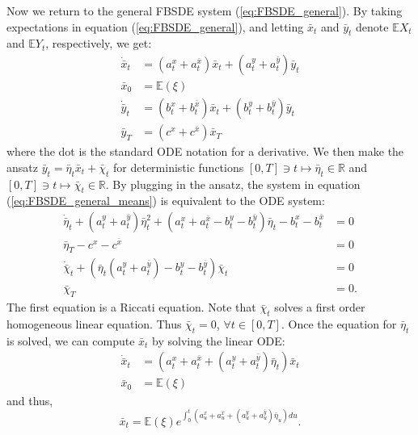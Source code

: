 \documentclass[11pt]{article}
\begin{document}
\begin{appendices}
Now we return to the general FBSDE system (\ref{eq:FBSDE_general}). By taking expectations in equation (\ref{eq:FBSDE_general}), and letting $\bar{x}_t$ and $\bar{y}_t$ denote $\mathbb{E}X_t$ and $\mathbb{E}Y_t$, respectively, we get:
\begin{equation}
\begin{split}
        \dot{\bar{x}}_t&=(a^x_t+a^{\bar{x}}_t)\bar{x}_t+(a^y_t+a^{\bar{y}}_t)\bar{y}_t\\
        \bar{x}_0&=\mathbb{E}(\xi) \\
        \dot{\bar{y}}_t&=(b^x_t+b^{\bar{x}}_t)\bar{x}_t+(b^y_t+b^{\bar{y}}_t)\bar{y}_t\\
        \bar{y}_T&=(c^x+c^{\bar{x}})\bar{x}_T
\end{split}
\label{eq:FBSDE_general_means}
\end{equation}
where the dot is the standard ODE notation for a derivative. We then make the ansatz $\bar{y}_t=\bar{\eta}_t\bar{x}_t+\bar{\chi}_t$ for deterministic functions $[0,T] \ni t \mapsto \bar{\eta}_t \in \mathbb{R}$ and $[0,T] \ni t \mapsto \bar{\chi}_t \in \mathbb{R}$. By plugging in the ansatz, the system in equation (\ref{eq:FBSDE_general_means}) is equivalent to the ODE system:
\begin{equation*}
\begin{split}
    \dot{\bar{\eta}}_t+(a^y_t+a^{\bar{y}}_t) \bar{\eta}_t^2+(a^x_t+a^{\bar{x}}_t-b^y_t-b^{\bar{y}}_t) \bar{\eta}_t -b^x_t-b^{\bar{x}}_t&=0\\
    \bar{\eta}_T-c^x-c^{\bar{x}}&=0 \\
    \dot{\bar{\chi}}_t+(\bar{\eta}_t(a^y_t+a^{\bar{y}}_t)-b^y_t-b^{\bar{y}}_t)\bar{\chi}_t &=0\\
    \bar{\chi}_T&=0.
\end{split}
\end{equation*}
The first equation is a Riccati equation. Note that $\bar{\chi}_t$ solves a first order homogeneous linear equation. Thus $\bar{\chi}_t=0$, $\forall t\in[0,T]$. Once the equation for $\bar{\eta}_t$ is solved, we can compute $\bar{x}_t$ by solving the linear ODE:
\begin{equation*}
\begin{split}
    \dot{\bar{x}}_t&=(a^x_t+a^{\bar{x}}_t+(a^y_t+a^{\bar{y}}_t)\bar{\eta}_t)\bar{x}_t \\
    \bar{x}_0&=\mathbb{E}(\xi)
\end{split}
\end{equation*}
and thus,
\begin{equation*}
    \bar{x}_t=\mathbb{E}(\xi) e^{\int_0^t(a^x_u+a^{\bar{x}}_u+(a^y_u+a^{\bar{y}}_u)\bar{\eta}_u)du}.
\end{equation*}


\end{appendices}
\end{document}
